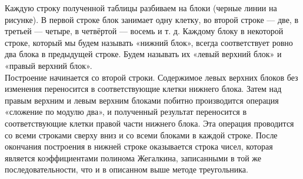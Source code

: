 \documentclass[a4paper, 14pt]{extarticle}
\begin{document}
Каждую строку полученной таблицы разбиваем на блоки (черные линии на рисунке). 
В первой строке блок занимает одну клетку, во второй строке — две, в третьей — четыре, 
в четвёртой — восемь и т. д. Каждому блоку в некоторой строке, который мы будем называть 
«нижний блок», всегда соответствует ровно два блока в предыдущей строке. Будем называть 
их «левый верхний блок» и «правый верхний блок».\\

Построение начинается со второй строки. Содержимое левых верхних блоков без 
изменения переносится в соответствующие клетки нижнего блока. Затем над правым верхним и 
левым верхним блоками побитно производится операция «сложение по модулю два», и полученный 
результат переносится в соответствующие клетки правой части нижнего блока. Эта операция проводится 
со всеми строками сверху вниз и со всеми блоками в каждой строке. После окончания построения 
в нижней строке оказывается строка чисел, которая является коэффициентами полинома 
Жегалкина, записанными в той же последовательности, что и в описанном выше методе треугольника. 
\end{document}
